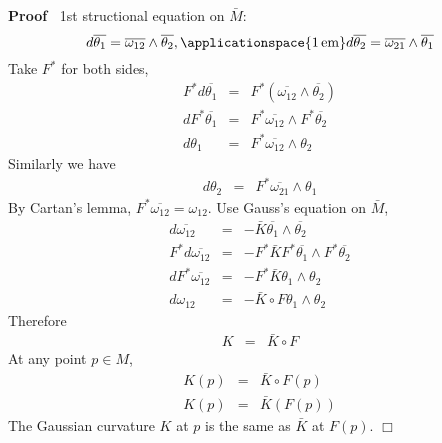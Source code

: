 \documentclass{article}
\newcommand{\tmop}[1]{\ensuremath{\operatorname{#1}}}
\newenvironment{proof}{\noindent\textbf{Proof\ }}{\hspace*{\fill}$\Box$\medskip}
\begin{document}
\begin{proof}
  1st structional equation on $\bar{M}$:
  \[ d \overline{\theta_1} = \overline{\omega_{12}} \wedge
     \overline{\theta_2}, \applicationspace{1 \tmop{em}} d \overline{\theta_2}
     = \overline{\omega_{21}} \wedge \overline{\theta_1} \]
  Take $F^{\ast}$ for both sides,
  \begin{eqnarray*}
    F^{\ast} d \overline{\theta_1} & = & F^{\ast} (\overline{\omega_{12}}
    \wedge \overline{\theta_2})\\
    d F^{\ast} \overline{\theta_1} & = & F^{\ast} \overline{\omega_{12}}
    \wedge F^{\ast} \overline{\theta_2}\\
    d \theta_1 & = & F^{\ast} \overline{\omega_{12}} \wedge \theta_2
  \end{eqnarray*}
  Similarly we have
  \[ \begin{array}{lll}
       d \theta_2 & = & F^{\ast} \overline{\omega_{21}} \wedge \theta_1
     \end{array} \]
  By Cartan's lemma, $F^{\ast} \overline{\omega_{12}} = \omega_{12}$. Use
  Gauss's equation on $\bar{M}$,
  \begin{eqnarray*}
    d \overline{\omega_{12}} & = & - \bar{K} \overline{\theta_1} \wedge
    \overline{\theta_2}\\
    F^{\ast} d \overline{\omega_{12}} & = & - F^{\ast} \bar{K} F^{\ast}
    \overline{\theta_1} \wedge F^{\ast} \overline{\theta_2}\\
    d F^{\ast} \overline{\omega_{12}} & = & - F^{\ast} \bar{K} \theta_1 \wedge
    \theta_2\\
    d \omega_{12} & = & - \bar{K} \circ F \theta_1 \wedge \theta_2
  \end{eqnarray*}
  Therefore
  \begin{eqnarray*}
    K & = & \bar{K} \circ F
  \end{eqnarray*}
  At any point $p \in M$,
  \begin{eqnarray*}
    K (p) & = & \bar{K} \circ F (p)\\
    K (p) & = & \bar{K} (F (p))
  \end{eqnarray*}
  The Gaussian curvature $K$ at $p$ is the same as $\bar{K}$ at $F (p)$.
\end{proof}

{}
\end{document}
